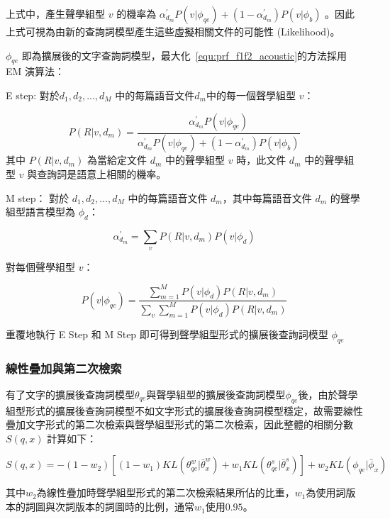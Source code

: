 上式中，產生聲學組型 $v$ 的機率為 $\alpha_{d_m}^{'} P(v|\phi_{qe}) + (1-\alpha_{d_m}^{'}) P(v|\phi_b)$ 。因此上式可視為由新的查詢詞模型產生這些虛擬相關文件的可能性 (Likelihood)。

$\phi_{qe}$ 即為擴展後的文字查詢詞模型，最大化~\ref{equ:prf_f1f2_acoustic}的方法採用 EM 演算法：

E step: 對於${d_1, d_2, ..., d_M}$ 中的每篇語音文件$d_m$中的每一個聲學組型 $v$：

\begin{equation}
\label{equ:prf_estep}
P(R|v, d_m) = \frac{\alpha_{d_m}^{'} P(v|\phi_{qe})}{\alpha_{d_m}^{'} P(v|\phi_{qe}) + (1-\alpha_{d_m}^{'}) P(v|\phi_b)}
\end{equation}
其中 $P(R|v, d_m)$ 為當給定文件 $d_m$ 中的聲學組型 $v$ 時，此文件 $d_m$ 中的聲學組型 $v$ 與查詢詞是語意上相關的機率。 

M step： 對於 ${d_1, d_2, ..., d_M}$ 中的每篇語音文件 $d_m$，其中每篇語音文件 $d_m$ 的聲學組型語言模型為 $\phi_d$：

\begin{equation}
\label{equ:prf_mstep}
\alpha_{d_m}^{'} = \sum_v P(R|v, d_m)P(v|\phi_d)
\end{equation}

對每個聲學組型 $v$：

\begin{equation}
P(v|\phi_{qe}) = \frac{\sum^M_{m=1} P(v|\phi_d) P(R|v, d_m)}{\sum_v \sum^M_{m=1} P(v|\phi_d) P(R|v, d_m)}
\end{equation}

重覆地執行 E Step 和 M Step 即可得到聲學組型形式的擴展後查詢詞模型 $\phi_{qe}$

\subsubsection{線性疊加與第二次檢索}
有了文字的擴展後查詢詞模型$\theta_{qe}$與聲學組型的擴展後查詢詞模型$\phi_{qe}$後，由於聲學組型形式的擴展後查詢詞模型不如文字形式的擴展後查詢詞模型穩定，故需要線性疊加文字形式的第二次檢索與聲學組型形式的第二次檢索，因此整體的相關分數 $S(q, x)$ 計算如下：

\begin{equation}
\label{equ:prf_interpolation}
S(q, x) = -{(1-w_2)[(1-w_1)KL(\theta_{qe}^{w}|\bar{\theta}_x^{w}) + w_1KL(\theta_{qe}^{s}|\bar{\theta}_x^{s})] + w_2KL(\phi_{qe}|\bar{\phi}_x)}
\end{equation}

其中$w_2$為線性疊加時聲學組型形式的第二次檢索結果所佔的比重，$w_1$為使用詞版本的詞圖與次詞版本的詞圖時的比例，通常$w_1$使用$0.95$。

